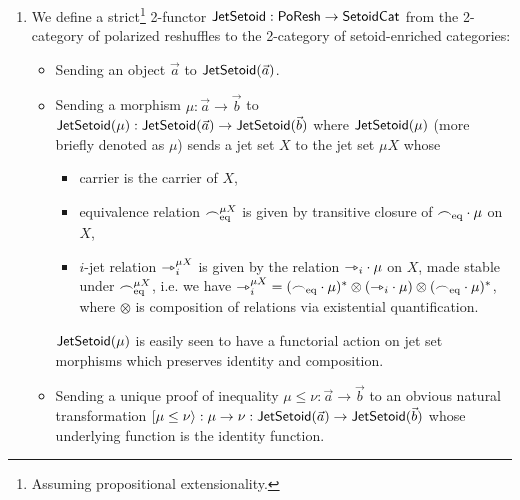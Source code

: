 \documentclass[a4paper]{memoir}
\begin{document}
\begin{definition} \label{def:poresh-jetsetoid} \label{def:poresh-jetset}
	\begin{enumerate}
		\item We define a strict\footnote{Assuming propositional extensionality.} 2-functor $\mathsf{JetSetoid} : \mathsf{PoResh} \to {\mathsf{Setoid}}{\mathsf{Cat}}$ from the 2-category of polarized reshuffles to the 2-category of setoid-enriched categories:
		\begin{itemize}
			\item Sending an object $\vec a$ to $\mathsf{JetSetoid}(\vec a)$.
			\item Sending a morphism $\mu : \vec a \to \vec b$ to $\mathsf{JetSetoid}(\mu) : \mathsf{JetSetoid}(\vec a) \to \mathsf{JetSetoid}(\vec b)$ where $\mathsf{JetSetoid}(\mu)$ (more briefly denoted as $\mu$) sends a jet set $X$ to the jet set $\mu X$ whose
			\begin{itemize}
				\item carrier is the carrier of $X$,
				\item equivalence relation ${\frown}_{{\mathrm{eq}}}^{\mu X}$ is given by transitive closure of ${\frown}_{{\mathrm{eq}}} \cdot \mu$ on $X$,
				\item $i$-jet relation ${\rightarrowtriangle}_i^{\mu X}$ is given by the relation ${\rightarrowtriangle}_i \cdot \mu$ on $X$, made stable under ${\frown}_{{\mathrm{eq}}}^{\mu X}$, i.e. we have
				${\rightarrowtriangle}_i^{\mu X} = ({\frown}_{{\mathrm{eq}}} \cdot \mu)^* \otimes ({\rightarrowtriangle}_i \cdot \mu) \otimes ({\frown}_{{\mathrm{eq}}} \cdot \mu)^*$, where $\otimes$ is composition of relations via existential quantification.
			\end{itemize}
			$\mathsf{JetSetoid}(\mu)$ is easily seen to have a functorial action on jet set morphisms which preserves identity and composition.
			\item Sending a unique proof of inequality $\mu \leq \nu : \vec a \to \vec b$ to an obvious natural transformation $\mathopen{}\left[ \mu \leq \nu \right\rangle\mathclose{} : \mu \to \nu : \mathsf{JetSetoid}(\vec a) \to \mathsf{JetSetoid}(\vec b)$ whose underlying function is the identity function.
		\end{itemize}
		

\end{enumerate}
\end{definition}
\end{document}
